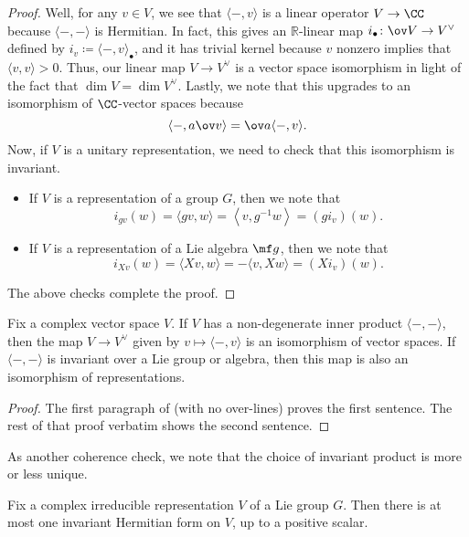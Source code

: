 \documentclass[../notes.tex]{subfiles}
\begin{document}
\begin{proof}
	Well, for any $v\in V$, we see that $\langle-,v\rangle$ is a linear operator $V\to\CC$ because $\langle-,-\rangle$ is Hermitian. In fact, this gives an $\mathbb R$-linear map $i_\bullet\colon\ov V\to V^\lor$ defined by $i_v\coloneqq\langle-,v\rangle_\bullet$, and it has trivial kernel because $v$ nonzero implies that $\langle v,v\rangle>0$. Thus, our linear map $V\to V^\lor$ is a vector space isomorphism in light of the fact that $\dim V=\dim V^\lor$. Lastly, we note that this upgrades to an isomorphism of $\CC$-vector spaces because
	\[\langle-,a\ov v\rangle=\ov a\langle-,v\rangle.\]
	Now, if $V$ is a unitary representation, we need to check that this isomorphism is invariant.
	\begin{itemize}
		\item If $V$ is a representation of a group $G$, then we note that
		\[i_{gv}(w)=\langle gv,w\rangle=\left\langle v,g^{-1}w\right\rangle=(gi_v)(w).\]
		\item If $V$ is a representation of a Lie algebra $\mf g$, then we note that
		\[i_{Xv}(w)=\langle Xv,w\rangle=-\langle v,Xw\rangle=(Xi_v)(w).\]
	\end{itemize}
	The above checks complete the proof.
\end{proof}
\begin{lemma} \label{lem:dualize-inner-prod-rep}
	Fix a complex vector space $V$. If $V$ has a non-degenerate inner product $\langle-,-\rangle$, then the map $V\to V^\lor$ given by $v\mapsto\langle-,v\rangle$ is an isomorphism of vector spaces. If $\langle-,-\rangle$ is invariant over a Lie group or algebra, then this map is also an isomorphism of representations.
\end{lemma}
\begin{proof}
	The first paragraph of  (with no over-lines) proves the first sentence. The rest of that proof verbatim shows the second sentence.
\end{proof}
As another coherence check, we note that the choice of invariant product is more or less unique.
\begin{proposition}
	Fix a complex irreducible representation $V$ of a Lie group $G$. Then there is at most one invariant Hermitian form on $V$, up to a positive scalar.
\end{proposition}
\end{document}
